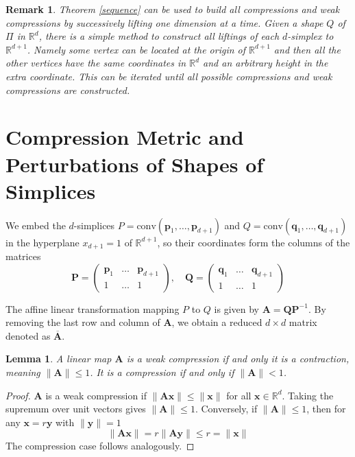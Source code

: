 \documentclass[a4paper, 12pt]{amsart}
\theoremstyle{plain}
\newtheorem{Lem}[Thm]{Lemma}
\newtheorem{Rem}[Thm]{Remark}
\begin{document}
\begin{Rem}
Theorem \ref{sequence} can be used to build all compressions and weak compressions by successively lifting one dimension at a time. Given a shape $Q$ of $\Pi$ in $\mathbb{R}^{d}$, there is a simple method to construct all liftings of each $d$-simplex to $\mathbb{R}^{d+1}$. 
Namely some vertex can be located at the origin of $\mathbb{R}^{d+1}$ and then all the other vertices have the same coordinates in $\mathbb{R}^{d}$ and an arbitrary height in the extra coordinate. This can be iterated until all possible compressions and weak compressions are constructed.

\end{Rem}




\section{Compression Metric and Perturbations of Shapes of Simplices}

We embed the $d$-simplices ${P} = \mbox{conv}(\mathbf{p}_1, \ldots, \mathbf{p}_{d + 1})$ and ${Q} = \mbox{conv}(\mathbf{q}_1, \ldots, \mathbf{q}_{d + 1})$ in the hyperplane $x_{d + 1} = 1$ of $\mathbb{R}^{d+1}$, so their coordinates form the columns of the matrices  
$$
\mathbf{P} = \begin{pmatrix}
\mathbf{p}_1 & \hdots & \mathbf{p}_{d + 1}\\
1 & \hdots & 1
\end{pmatrix}, \quad
\mathbf{Q} = \begin{pmatrix}
\mathbf{q}_1 & \hdots & \mathbf{q}_{d + 1}\\
1 & \hdots & 1
\end{pmatrix}
$$

The affine linear transformation mapping ${P}$ to ${Q}$ is given by $\mathbf{A} = \mathbf{Q} \mathbf{P}^{-1}$. By removing the last row and column of $\mathbf{A}$, we obtain a reduced $d \times d$ matrix denoted as $\overline{\mathbf{A}}$.


\begin{Lem} \label{contrac}
A linear map $\mathbf{A}$ is a weak compression if and only it is a contraction, meaning $\|\mathbf{A}\| \leq 1$. It is a compression if and only if $\|\mathbf{A}\| < 1$.
\end{Lem}

\begin{proof}
$\mathbf{A}$ is a weak compression if $\|\mathbf{A} \mathbf{x}\| \leq \|\mathbf{x}\|$ for all $\mathbf{x} \in \mathbb{R}^d$. Taking the supremum over unit vectors gives $\|\mathbf{A}\| \leq 1$. Conversely, if $\|\mathbf{A}\| \leq 1$, then for any $\mathbf{x} = r \mathbf{y}$ with $\|\mathbf{y}\| = 1$  
$$
\|\mathbf{A} \mathbf{x}\| = r \|\mathbf{A} \mathbf{y}\| \leq r = \|\mathbf{x}\|
$$
 The compression case follows analogously.
\end{proof}
\end{document}
